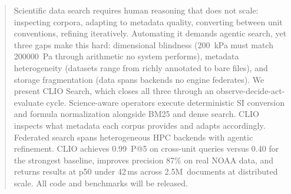 \begin{abstract}
Scientific data search requires human reasoning that does not scale: inspecting corpora, adapting to metadata quality, converting between unit conventions, refining iteratively. Automating it demands agentic search, yet three gaps make this hard: dimensional blindness (200~kPa must match 200000~Pa through arithmetic no system performs), metadata heterogeneity (datasets range from richly annotated to bare files), and storage fragmentation (data spans backends no engine federates).
We present CLIO Search, which closes all three through an observe-decide-act-evaluate cycle. Science-aware operators execute deterministic SI conversion and formula normalization alongside BM25 and dense search. CLIO inspects what metadata each corpus provides and adapts accordingly. Federated search spans heterogeneous HPC backends with agentic refinement.
CLIO achieves 0.99~P@5 on cross-unit queries versus 0.40 for the strongest baseline, improves precision 87\% on real NOAA data, and returns results at p50 under 42\,ms across 2.5M~documents at distributed scale. All code and benchmarks will be released.
\end{abstract}